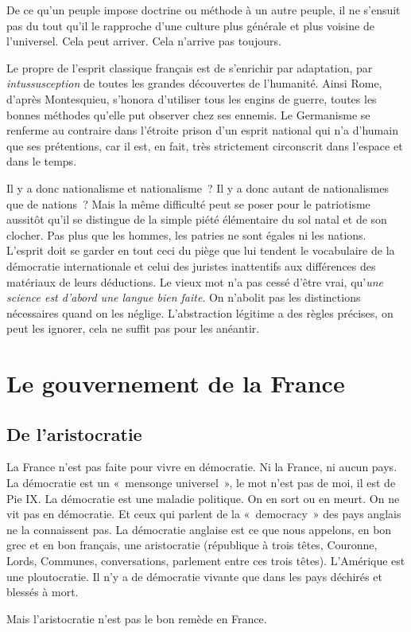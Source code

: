 \documentclass[french,twoside]{book} %
\newcommand{\astermono}{\medskip\centerline{\color{rubric}\large\selectfont{\syms ✻}}\medskip\par}%
\begin{document}
\astermono

\noindent De ce qu’un peuple impose doctrine ou méthode à un autre peuple, il ne s’ensuit pas du tout qu’il le rapproche d’une culture plus générale et plus voisine de l’universel. Cela peut arriver. Cela n’arrive pas toujours.\par

\astermono

\noindent Le propre de l’esprit classique français est de s’enrichir par adaptation, par \emph{intussusception} de toutes les grandes découvertes de l’humanité. Ainsi Rome, d’après Montesquieu, s’honora d’utiliser tous les engins de guerre, toutes les bonnes méthodes qu’elle put observer chez ses ennemis. Le Germanisme se renferme au contraire dans l’étroite prison d’un esprit national qui n’a d’humain que ses prétentions, car il est, en fait, très strictement circonscrit dans l’espace et dans le temps.\par
Il y a donc nationalisme et nationalisme ? Il y a donc autant de nationalismes que de nations ? Mais la même difficulté peut se poser pour le patriotisme aussitôt qu’il se distingue de la simple piété élémentaire du sol natal et de son clocher. Pas plus que les hommes, les patries ne sont égales ni les nations. L’esprit doit se garder en tout ceci du piège que lui tendent le vocabulaire de la démocratie internationale et celui des juristes inattentifs aux différences des matériaux de leurs déductions. Le vieux mot n’a pas cessé d’être vrai, qu’\emph{une science est d’abord une langue bien faite}. On n’abolit pas les distinctions nécessaires quand on les néglige. L’abstraction légitime a des règles précises, on peut les ignorer, cela ne suffit pas pour les anéantir.
\section[Le gouvernement de la France]{Le gouvernement de la France}
\subsection[De l’aristocratie]{De l’aristocratie}
\noindent La France n’est pas faite pour vivre en démocratie. Ni la France, ni aucun pays. La démocratie est un « mensonge universel », le mot n’est pas de moi, il est de Pie IX. La démocratie est une maladie politique. On en sort ou en meurt. On ne vit pas en démocratie. Et ceux qui parlent de la « democracy » des pays anglais ne la connaissent pas. La démocratie anglaise est ce que nous appelons, en bon grec et en bon français, une aristocratie (république à trois têtes, Couronne, Lords, Communes, conversations, parlement entre ces trois têtes). L’Amérique est une ploutocratie. Il n’y a de démocratie vivante que dans les pays déchirés et blessés à mort.\par
Mais l’aristocratie n’est pas le bon remède en France.\par
\end{document}
